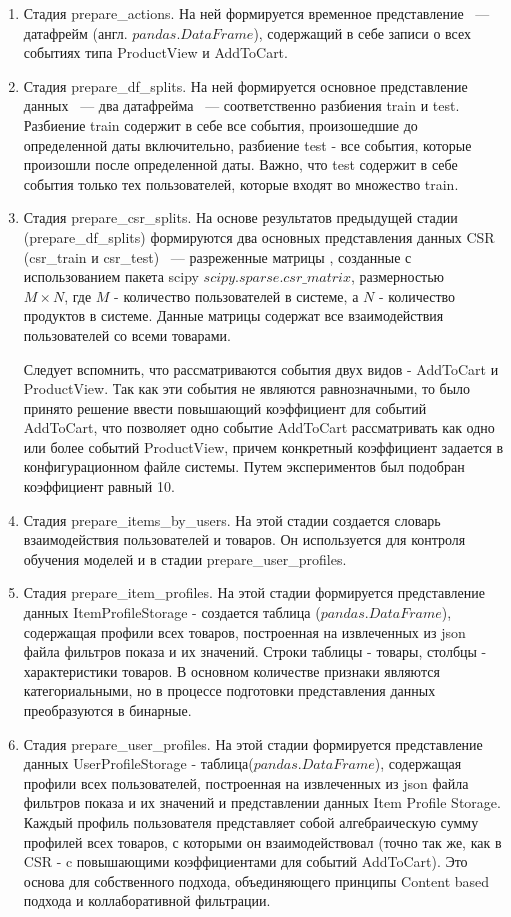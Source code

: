 \documentclass[14pt]{mmcs_article}
\newenvironment{myenumerate}
{ \begin{enumerate}
		\setlength{\itemsep}{0pt}
		\setlength{\parskip}{0pt}
		\setlength{\parsep}{0pt}     }
	{ \end{enumerate}                  }
\begin{document}
\begin{myenumerate}
	\item Стадия prepare\_actions. На ней формируется временное представление ~--- датафрейм (англ. $pandas$.$DataFrame$), содержащий в себе записи о всех событиях типа  ProductView и AddToCart.
	\item Стадия prepare\_df\_splits. На ней формируется основное представление данных ~--- два  датафрейма ~--- соответственно разбиения train и test. Разбиение train содержит в себе все события, произошедшие до определенной даты включительно, разбиение test - все события, которые произошли после определенной даты. Важно, что test содержит в себе события только тех пользователей, которые входят во множество train. 
	\item Стадия prepare\_csr\_splits. На основе результатов предыдущей стадии  (prepare\_df\_splits) формируются два основных представления данных CSR (csr\_train и csr\_test) ~--- разреженные матрицы , созданные с использованием пакета scipy $scipy$.$sparse$.$csr\_matrix$, размерностью \\ $M \times N$, где $M$ - количество пользователей в системе, а $N$ - количество продуктов в системе. Данные матрицы содержат все взаимодействия пользователей со всеми товарами. 
	
	Следует вспомнить, что рассматриваются события двух видов - AddToCart и ProductView. Так как эти события не являются равнозначными, то было принято решение ввести повышающий коэффициент для событий AddToCart, что позволяет одно событие AddToCart рассматривать как одно или более событий ProductView, причем конкретный коэффициент задается в конфигурационном файле системы. Путем экспериментов был подобран коэффициент равный 10.
	\item Стадия prepare\_items\_by\_users. На этой стадии создается словарь взаимодействия пользователей и товаров. Он используется для контроля обучения моделей и в стадии prepare\_user\_profiles.
	\item Стадия prepare\_item\_profiles. На этой стадии формируется представление данных ItemProfileStorage - создается таблица ($pandas$.$DataFrame$), содержащая профили всех товаров, построенная на извлеченных из json файла фильтров показа и их значений. Строки таблицы - товары, столбцы - характеристики товаров. В основном количестве признаки являются категориальными, но в процессе подготовки представления данных преобразуются в бинарные.
	\item Стадия prepare\_user\_profiles. На этой стадии формируется представление данных UserProfileStorage - таблица($pandas$.$DataFrame$), содержащая профили всех пользователей, построенная на извлеченных из json файла фильтров показа и их значений и представлении данных Item Profile Storage. Каждый профиль пользователя представляет собой алгебраическую сумму профилей всех товаров, с которыми он взаимодействовал (точно так же, как в CSR - c повышающими коэффициентами для событий AddToCart). Это основа для собственного подхода, объединяющего принципы Content based подхода и коллаборативной фильтрации.
	
\end{myenumerate}
\end{document}
